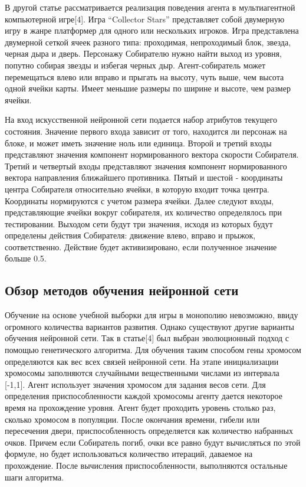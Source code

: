 \begin{Large}
В другой статье рассматривается реализация поведения агента в мультиагентной компьютерной игре[4]. Игра “Collector Stars” представляет собой двумерную игру в жанре платформер для одного или нескольких игроков. Игра представлена двумерной сеткой ячеек разного типа: проходимая, непроходимый блок, звезда, черная дыра и дверь. Персонажу Собирателю нужно найти выход из уровня, попутно собирая звезды и избегая черных дыр. Агент-собиратель может перемещаться влево или вправо и прыгать на высоту, чуть выше, чем высота одной ячейки карты.  Имеет меньшие размеры по ширине и высоте, чем размер ячейки.

На вход искусственной нейронной сети подается набор атрибутов текущего состояния. Значение первого входа зависит от того, находится ли персонаж на блоке, и может иметь значение ноль или единица. Второй и третий входы представляют значения компонент нормированного вектора скорости Собирателя. Третий и четвертый входы представляют значения компонент нормированного вектора направления ближайшего противника. Пятый и шестой - координаты центра Собирателя относительно ячейки, в которую входит точка центра. Координаты нормируются с учетом размера ячейки. Далее следуют входы, представляющие ячейки вокруг собирателя, их количество определялось при тестировании. Выходом сети будут три значения, исходя из которых будут определены действия Собирателя: движение влево, вправо и прыжок, соответственно. Действие будет активизировано, если полученное значение больше 0.5.
\subsection{Обзор методов обучения нейронной сети}
Обучение на основе учебной выборки для игры в монополию невозможно, ввиду огромного количества вариантов развития. Однако существуют другие варианты обучения нейронной сети. Так в статье[4] был выбран эволюционный подход с помощью генетического алгоритма. Для обучения таким способом гены хромосом определяются как вес всех связей нейронной сети. На этапе инициализации хромосомы заполняются случайными вещественными числами из интервала [-1,1]. Агент использует значения хромосом для задания весов сети. Для определения приспособленности каждой хромосомы агенту дается некоторое время на прохождение уровня. Агент будет проходить уровень столько раз, сколько хромосом в популяции. После окончания времени, гибели или пересечения двери, приспособленность определяется как количество набранных очков. Причем если Собиратель погиб, очки все равно будут вычисляться по этой формуле, но будет использоваться количество итераций, даваемое на прохождение. После вычисления приспособленности, выполняются остальные шаги алгоритма.


\end{Large}
